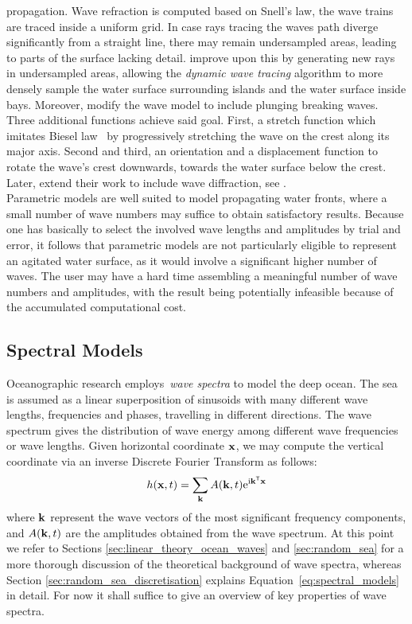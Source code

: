 propagation. Wave refraction is computed based on Snell's law, the wave trains
are traced inside a uniform grid. In case rays tracing the waves path diverge
significantly from a straight line, there may remain undersampled areas,
leading to parts of the surface lacking detail. \cite{Gonzato:1997} improve
upon this by generating new rays in undersampled areas, allowing the
\emph{dynamic wave tracing} algorithm to more densely sample the water surface
surrounding islands and the water surface inside bays. Moreover,
\citeauthor{Gonzato:1997} modify the wave model to include plunging breaking
waves. Three additional functions achieve said goal.
First, a stretch function which imitates Biesel law~\citep{Biesel:1952} by
progressively stretching the wave on the crest along its major axis. Second and
third, an orientation and a displacement function to rotate the wave's crest
downwards, towards the water surface below the crest. Later,
\citeauthor{Gonzato:2000} extend their work to include wave diffraction, see
\cite{Gonzato:2000}.\\

Parametric models are well suited to model propagating water fronts, where a
small number of wave numbers may suffice to obtain satisfactory results. 
Because one has basically to select the involved wave lengths and amplitudes
by trial and error, it follows that parametric models are not particularly
eligible to represent an agitated water surface, as it would involve a
significant higher number of waves. The user may have a hard time assembling a
meaningful number of wave numbers and amplitudes, with the result being
potentially infeasible because of the accumulated computational cost.
\subsection{Spectral Models}
Oceanographic research employs~\emph{wave spectra} to model the deep ocean. The
sea is assumed as a linear superposition of sinusoids with many different wave
lengths, frequencies and phases, travelling in different directions. The wave
spectrum gives the distribution of wave energy among different wave frequencies
or wave lengths. Given horizontal coordinate $\mathbf{x}$, we may compute the
vertical coordinate via an inverse Discrete Fourier Transform as follows:
\begin{equation}
h(\mathbf{x},t) = \sum_{\mathbf{k}}A(\mathbf{k},t)\mathrm{e}^{\mathrm{i}\mathbf{k}^{\mathsf{T}}\mathbf{x}}
\label{eq:spectral_models}
\end{equation}
where $\mathbf{k}$ represent the wave vectors of the most significant frequency
components, and $A(\mathbf{k},t)$ are the amplitudes obtained from the wave
spectrum. At this point we refer to Sections \ref{sec:linear_theory_ocean_waves}
and \ref{sec:random_sea} for a more thorough discussion of the theoretical
background of wave spectra, whereas Section \ref{sec:random_sea_discretisation}
explains Equation~\ref{eq:spectral_models} in detail. For now it shall suffice
to give an overview of key properties of wave spectra. 

